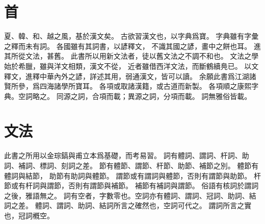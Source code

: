 \chapter*{首}
夏、韓、和、越之風，基於漢文矣。
古欲習漢文也，以字典爲寶。
字典雖有字彙之釋而未有詞。
各國雖有其詞書，以諺釋文，
不識其國之諺，畫中之餅也耳。
進其所從文法，甚舊。
此書所以用新文法者，徒以舊文法之不調不和也。
文法之學始於希臘，雖與洋文相類，漢文不從，
近者雖借西洋文法，而斷鶴續鳧已\parencite{Ahn:2012}。
以文釋文，進釋中華內外之諺，詳述其用，弱通漢文，皆可以讀。
余願此書爲江湖諸賢所參，爲四海諸學所寶耳。
各項或取諸漢籍，或古道而新製。
各項順之康熙字典。空詞略之。
同源之詞，合項而載；異源之詞，分項而載。
詞無雅俗皆載。
\chapter*{文法}
此書之所用以金琮鎬與甫立本爲基礎，而考易習。
詞有體詞、謂詞、杆詞、助詞、補詞、標詞、刻詞之差\parencite[][2-35]{Kim:2019}。
節有體節、謂節、杆節、助節、補節之別\parencite[][15]{Kim:2019}。
體節有體詞與結節，
助節有助詞與體節。
謂節或有謂詞與體節，否則有謂節與助節。
杆節或有杆詞與謂節，否則有謂節與補節。
補節有補詞與謂節。
俗語有核詞於謂詞之後，雅語無之。
詞有空者，字數零也\parencite[][2]{Kim:2019}。空詞亦有體詞、謂詞、冠詞、助詞、結詞之差。
體詞、謂詞、助詞、結詞所言之確然也，空詞可代之。
謂詞所言之實也，冠詞槪空。
